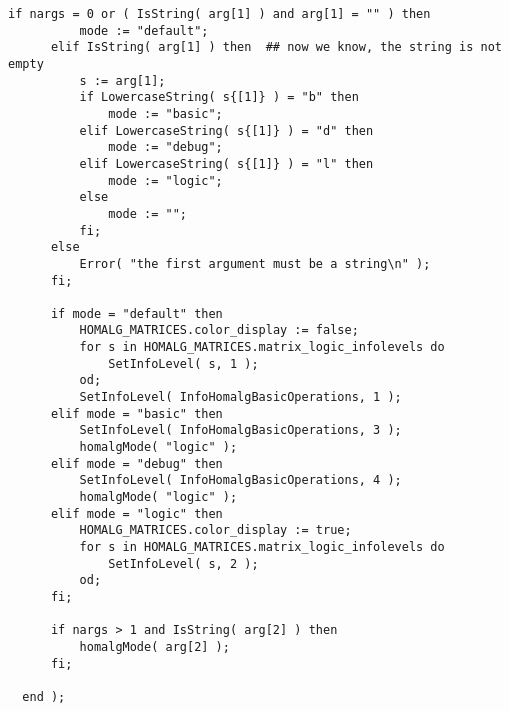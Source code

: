 \documentclass[a4paper,11pt]{report}
\begin{document}
{{{\begin{Verbatim}[fontsize=\small,frame=single,label=Code]
      if nargs = 0 or ( IsString( arg[1] ) and arg[1] = "" ) then
          mode := "default";
      elif IsString( arg[1] ) then	## now we know, the string is not empty
          s := arg[1];
          if LowercaseString( s{[1]} ) = "b" then
              mode := "basic";
          elif LowercaseString( s{[1]} ) = "d" then
              mode := "debug";
          elif LowercaseString( s{[1]} ) = "l" then
              mode := "logic";
          else
              mode := "";
          fi;
      else
          Error( "the first argument must be a string\n" );
      fi;
      
      if mode = "default" then
          HOMALG_MATRICES.color_display := false;
          for s in HOMALG_MATRICES.matrix_logic_infolevels do
              SetInfoLevel( s, 1 );
          od;
          SetInfoLevel( InfoHomalgBasicOperations, 1 );
      elif mode = "basic" then
          SetInfoLevel( InfoHomalgBasicOperations, 3 );
          homalgMode( "logic" );
      elif mode = "debug" then
          SetInfoLevel( InfoHomalgBasicOperations, 4 );
          homalgMode( "logic" );
      elif mode = "logic" then
          HOMALG_MATRICES.color_display := true;
          for s in HOMALG_MATRICES.matrix_logic_infolevels do
              SetInfoLevel( s, 2 );
          od;
      fi;
      
      if nargs > 1 and IsString( arg[2] ) then
          homalgMode( arg[2] );
      fi;
      
  end );
\end{Verbatim}
 }

 }

  }
\end{document}
